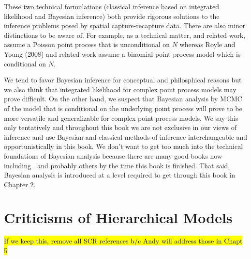 These two technical formulations (classical inference based on
integrated likelihood and Bayesian inference) both provide rigorous solutions to
the inference problems posed by spatial capture-recapture data.  There
are also minor distinctions to be aware of. For example,
as a technical matter, \citet{borchers_efford:2008} and related work, assume
a Poisson point process that is unconditional on $N$ whereas Royle and
Young (2008) and related work assume a binomial point process model
which is conditional on $N$.

We tend to favor Bayesian inference for conceptual and philosphical
reasons but we also think that  integrated likelihood
for complex point process models may prove difficult. On the other
hand, we suspect that Bayesian
analysis by MCMC
of the model that is conditional on the underlying point process will
prove to be more versatile and generalizable for complex point process
models. We say this only
tentatively and throughout this book we are not exclusive in our views
of inference and use Bayesian and classical methods of inference
interchangeable and opportunistically in this book.
We don't want to get too much into the technical foundations of
Bayesian analysis because there are many good books now including
\citet{link_barker:2010}.  \citet{kery:2010, mccarthy:2007,
  king_etal:2009} and probably others by the time this book is
finished. That said,  Bayesian analysis is introduced at a
level required to get through this book in Chapter 2.









\section{Criticisms of Hierarchical Models}

\hl{If we keep this, remove all SCR references b/c Andy will address
  those in Chapt 5}

